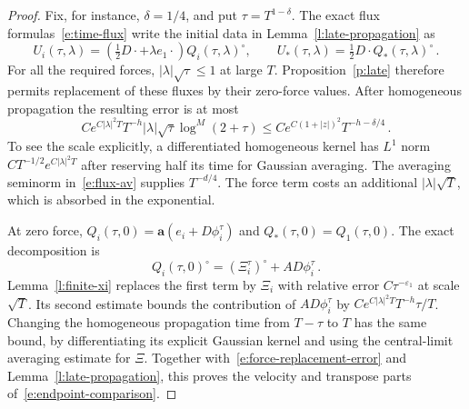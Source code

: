 \documentclass[11pt]{amsart}
\theoremstyle{definition}
\theoremstyle{remark}
\numberwithin{equation}{section}
\renewcommand{\a}{\mathbf a}
\begin{document}
\begin{proof}
Fix, for instance, $\delta=1/4$, and put $\tau=T^{1-\delta}$. The exact flux formulas~\eqref{e:time-flux} write the initial data in Lemma~\ref{l:late-propagation} as
\begin{equation*}
 U_i(\tau,\lambda)
   =(\tfrac12D\cdot+\lambda e_1\cdot)Q_i(\tau,\lambda)^\circ,
 \qquad
 U_*(\tau,\lambda)=\tfrac12D\cdot Q_*(\tau,\lambda)^\circ\, .
\end{equation*}
For all the required forces, $|\lambda|\sqrt\tau\leq1$ at large $T$. Proposition~\ref{p:late} therefore permits replacement of these fluxes by their zero-force values. After homogeneous propagation the resulting error is at most
\begin{equation}\label{e:force-replacement-error}
 Ce^{C|\lambda|^2T}T^{-h}
       |\lambda|\sqrt\tau\log^M(2+\tau)
 \leq Ce^{C(1+|z|)^2}T^{-h-\delta/4}\, .
\end{equation}
To see the scale explicitly, a differentiated homogeneous kernel has $L^1$ norm $CT^{-1/2}e^{C|\lambda|^2T}$ after reserving half its time for Gaussian averaging. The averaging seminorm in~\eqref{e:flux-av} supplies $T^{-d/4}$. The force term costs an additional $|\lambda|\sqrt T$, which is absorbed in the exponential.

At zero force, $Q_i(\tau,0)=\a(e_i+D\phi_i^\tau)$ and $Q_*(\tau,0)=Q_1(\tau,0)$. The exact decomposition is
\begin{equation*}
 Q_i(\tau,0)^\circ=(\Xi_i^\tau)^\circ+A D\phi_i^\tau\, .
\end{equation*}
Lemma~\ref{l:finite-xi} replaces the first term by $\Xi_i$ with relative error $C\tau^{-\varepsilon_1}$ at scale $\sqrt T$. Its second estimate bounds the contribution of $A D\phi_i^\tau$ by $Ce^{C|\lambda|^2T}T^{-h}\tau/T$. Changing the homogeneous propagation time from $T-\tau$ to $T$ has the same bound, by differentiating its explicit Gaussian kernel and using the central-limit averaging estimate for $\Xi$. Together with~\eqref{e:force-replacement-error} and Lemma~\ref{l:late-propagation}, this proves the velocity and transpose parts of~\eqref{e:endpoint-comparison}.


\end{proof}
\end{document}
